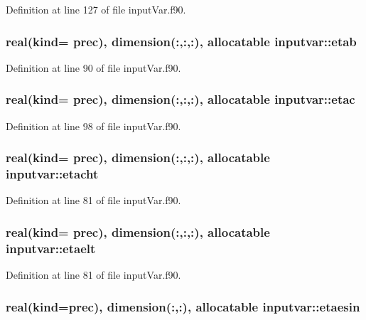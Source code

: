 Definition at line 127 of file input\-Var.\-f90.

\hypertarget{classinputvar_adba062c6d3ce600124e2cd8943f7c6e6}{
\subsubsection[{etab}]{\setlength{\rightskip}{0pt plus 5cm}real(kind= prec), dimension(\-:,\-:,\-:), allocatable inputvar\-::etab}}\label{classinputvar_adba062c6d3ce600124e2cd8943f7c6e6}


Definition at line 90 of file input\-Var.\-f90.

\hypertarget{classinputvar_a3c6d7517ec3f9097a8d4264b50e61b48}{
\subsubsection[{etac}]{\setlength{\rightskip}{0pt plus 5cm}real(kind= prec), dimension(\-:,\-:,\-:), allocatable inputvar\-::etac}}\label{classinputvar_a3c6d7517ec3f9097a8d4264b50e61b48}


Definition at line 98 of file input\-Var.\-f90.

\hypertarget{classinputvar_a7cd43a0a5d5ddb8d50af96d4c4f81bea}{
\subsubsection[{etacht}]{\setlength{\rightskip}{0pt plus 5cm}real(kind= prec), dimension(\-:,\-:,\-:), allocatable inputvar\-::etacht}}\label{classinputvar_a7cd43a0a5d5ddb8d50af96d4c4f81bea}


Definition at line 81 of file input\-Var.\-f90.

\hypertarget{classinputvar_af7479b2afabbd7d596d91bb1319b0a8e}{
\subsubsection[{etaelt}]{\setlength{\rightskip}{0pt plus 5cm}real(kind= prec), dimension(\-:,\-:,\-:), allocatable inputvar\-::etaelt}}\label{classinputvar_af7479b2afabbd7d596d91bb1319b0a8e}


Definition at line 81 of file input\-Var.\-f90.

\hypertarget{classinputvar_a1456f5042efdddbb5170fa662434c5a5}{
\subsubsection[{etaesin}]{\setlength{\rightskip}{0pt plus 5cm}real(kind=prec), dimension(\-:,\-:), allocatable inputvar\-::etaesin}}\label{classinputvar_a1456f5042efdddbb5170fa662434c5a5}


